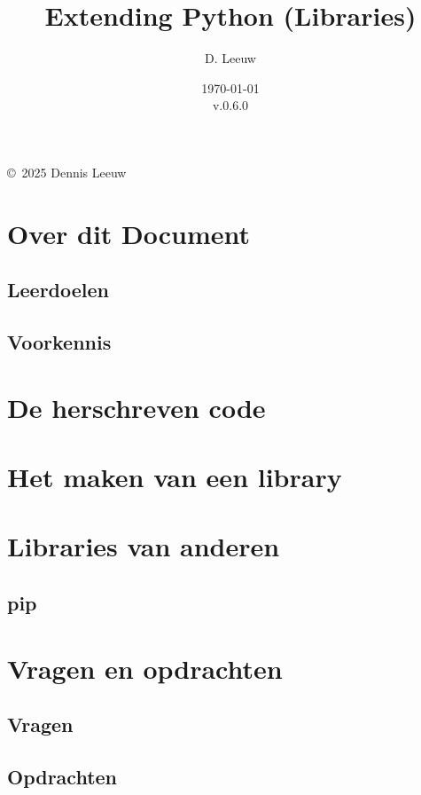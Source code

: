 \documentclass[a4paper,12pt,twoside,openright,titlepage]{book}
\author{D. Leeuw}
\title{Extending Python (Libraries)}
\date{\today\\v.0.6.0}
\begin{document}

\maketitle

\copyright\ 2025 Dennis Leeuw\\




\frontmatter
\chapter{Over dit Document}
\section{Leerdoelen}

\section{Voorkennis}


\tableofcontents

\mainmatter

\chapter{De herschreven code}


\chapter{Het maken van een library}


\chapter{Libraries van anderen}

\section{pip}


\chapter{Vragen en opdrachten}
\section{Vragen}

\section{Opdrachten}


\printindex
\end{document}

